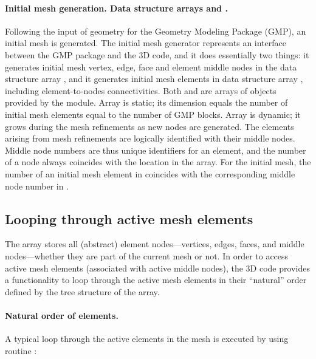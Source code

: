\paragraph{Initial mesh generation. Data structure arrays  and .}

Following the input of geometry for the Geometry Modeling Package (GMP), an initial mesh is generated. The initial mesh generator represents an interface between the GMP package and the \hp3D code, and it does essentially two things: it generates initial mesh vertex, edge, face and element middle nodes in the data structure array , and it generates initial mesh elements in data structure array , including element-to-nodes connectivities. Both  and  are arrays of objects provided by the  module. Array  is static; its dimension equals the number of initial mesh elements equal to the number of GMP blocks. Array  is dynamic; it grows during the mesh refinements as new nodes are generated. The elements arising from mesh refinements are logically identified with their middle nodes. Middle node numbers are thus unique identifiers for an element, and the number of a node always coincides with the location in the  array. For the initial mesh, the number of an initial mesh element in  coincides with the corresponding middle node number in .


\subsection{Looping through active mesh elements}
\label{sec:element-nodes}

The  array stores all (abstract) element nodes---vertices, edges, faces, and middle nodes---whether they are part of the current mesh or not. In order to access active mesh elements (associated with active middle nodes), the \hp3D code provides a functionality to loop through the active mesh elements in their ``natural'' order defined by the tree structure of the  array.

\paragraph{Natural order of elements.}

A typical loop through the active elements in the mesh is executed by using routine :

